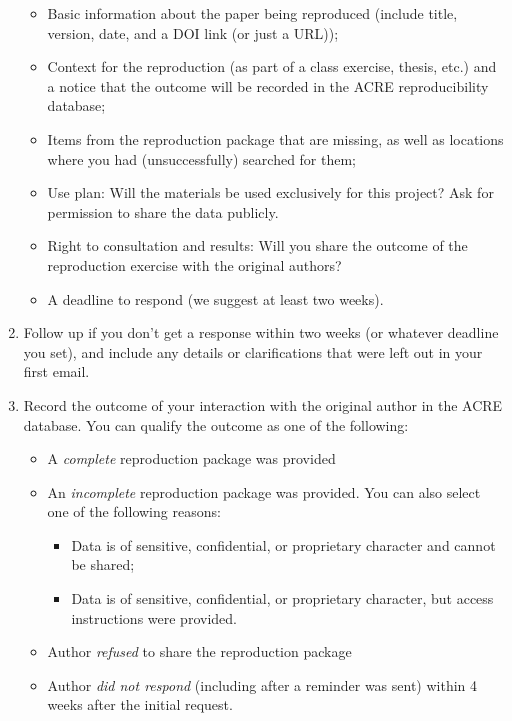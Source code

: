 \documentclass[]{book}
\providecommand{\tightlist}{%
  \setlength{\itemsep}{0pt}\setlength{\parskip}{0pt}}
\begin{document}
\begin{enumerate}
  \begin{itemize}
  \tightlist
  \item
    Basic information about the paper being reproduced (include title, version, date, and a DOI link (or just a URL));\\
  \item
    Context for the reproduction (as part of a class exercise, thesis, etc.) and a notice that the outcome will be recorded in the ACRE reproducibility database;
  \item
    Items from the reproduction package that are missing, as well as locations where you had (unsuccessfully) searched for them;\\
  \item
    Use plan: Will the materials be used exclusively for this project? Ask for permission to share the data publicly.\\
  \item
    Right to consultation and results: Will you share the outcome of the reproduction exercise with the original authors?\\
  \item
    A deadline to respond (we suggest at least two weeks).
  \end{itemize}
\item
  Follow up if you don't get a response within two weeks (or whatever deadline you set), and include any details or clarifications that were left out in your first email.
\item
  Record the outcome of your interaction with the original author in the ACRE database. You can qualify the outcome as one of the following:

  \begin{itemize}
  \tightlist
  \item
    A \emph{complete} reproduction package was provided
  \item
    An \emph{incomplete} reproduction package was provided. You can also select one of the following reasons:

    \begin{itemize}
    \tightlist
    \item
      Data is of sensitive, confidential, or proprietary character and cannot be shared;
    \item
      Data is of sensitive, confidential, or proprietary character, but access instructions were provided.
    \end{itemize}
  \item
    Author \emph{refused} to share the reproduction package
  \item
    Author \emph{did not respond} (including after a reminder was sent) within 4 weeks after the initial request.
  \end{itemize}
\end{enumerate}
\end{document}
